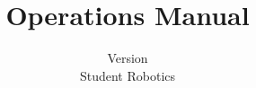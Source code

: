 \documentclass[a4paper]{scrreprt}
\title{Operations Manual}
\author{Version  \\
Student Robotics}
\begin{document}
\maketitle

\tableofcontents









\begin{appendices}

\end{appendices}
\end{document}
